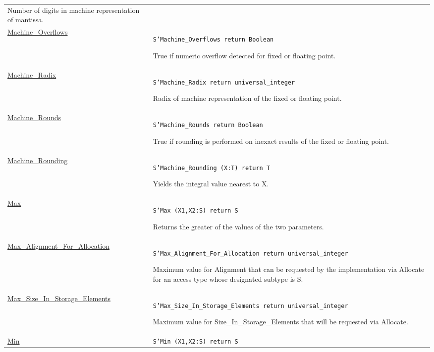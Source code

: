 \documentclass[english]{article}
\begin{document}
\begin{scriptsize}
\begin{multicols*}{3}
\begin{tabular}{@{}p{2cm}p{6.5cm}}
   Number of digits in machine representation of mantissa.\\

   \href{http://www.ada-auth.org/standards/22rm/html/RM-K-2.html}{Machine\_Overflows} & \texttt{S'Machine\_Overflows return Boolean}

   True if numeric overflow detected for fixed or floating point.\\

   \href{http://www.ada-auth.org/standards/22rm/html/RM-K-2.html}{Machine\_Radix} & \texttt{S'Machine\_Radix return universal\_integer}

   Radix of machine representation of the fixed or floating point.\\

   \href{http://www.ada-auth.org/standards/22rm/html/RM-K-2.html}{Machine\_Rounds} & \texttt{S'Machine\_Rounds return Boolean}

   True if rounding is performed on inexact results of the fixed or floating point.\\

   \href{http://www.ada-auth.org/standards/22rm/html/RM-K-2.html}{Machine\_Rounding} & \texttt{S'Machine\_Rounding (X:T) return T}

   Yields the integral value nearest to X.\\

   \href{http://www.ada-auth.org/standards/22rm/html/RM-K-2.html}{Max} & \texttt{S'Max (X1,X2:S) return S}

   Returns the greater of the values of the two parameters.\\

   \href{http://www.ada-auth.org/standards/22rm/html/RM-K-2.html}{Max\_Alignment\_For\_Allocation} & \texttt{S'Max\_Alignment\_For\_Allocation return universal\_integer}

   Maximum value for Alignment that can be requested by the implementation via Allocate for an access type whose designated subtype is S.\\

   \href{http://www.ada-auth.org/standards/22rm/html/RM-K-2.html}{Max\_Size\_In\_Storage\_Elements} & \texttt{S'Max\_Size\_In\_Storage\_Elements return universal\_integer}

   Maximum value for Size\_In\_Storage\_Elements that will be requested via Allocate.\\

   \href{http://www.ada-auth.org/standards/22rm/html/RM-K-2.html}{Min} & \texttt{S'Min (X1,X2:S) return S}


\end{tabular}
\end{multicols*}
\end{scriptsize}
\end{document}
